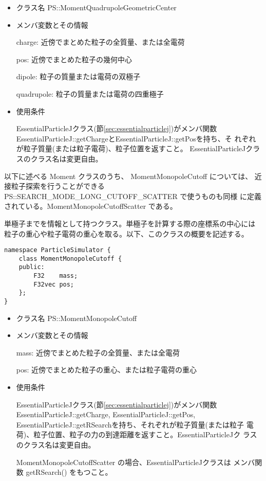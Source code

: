\begin{itemize}
\item クラス名
  PS::MomentQuadrupoleGeometricCenter

\item メンバ変数とその情報

  charge: 近傍でまとめた粒子の全質量、または全電荷

  pos: 近傍でまとめた粒子の幾何中心

  dipole: 粒子の質量または電荷の双極子

  quadrupole: 粒子の質量または電荷の四重極子

\item 使用条件

  EssentialParticleJクラス(節\ref{sec:essentialparticlej})がメンバ関数
  EssentialParticleJ::getChargeとEssentialParticleJ::getPosを持ち、そ
  れぞれが粒子質量(または粒子電荷)、粒子位置を返すこと。
  EssentialParticleJクラスのクラス名は変更自由。

\end{itemize}



以下に述べる Moment クラスのうち、
MomentMonopoleCutoff については、
近接粒子探索を行うことができる PS::SEARCH\_MODE\_LONG\_CUTOFF\_SCATTER で使うものも同様
に定義されている。MomentMonopoleCutoffScatter である。



単極子までを情報として持つクラス。単極子を計算する際の座標系の中心には
粒子の重心や粒子電荷の重心を取る。以下、このクラスの概要を記述する。
\begin{screen}
\begin{verbatim}
namespace ParticleSimulator {
    class MomentMonopoleCutoff {
    public:
        F32    mass;
        F32vec pos;
    };
}
\end{verbatim}
\end{screen}

\begin{itemize}
\item クラス名
  PS::MomentMonopoleCutoff

\item メンバ変数とその情報

  mass: 近傍でまとめた粒子の全質量、または全電荷

  pos: 近傍でまとめた粒子の重心、または粒子電荷の重心

\item 使用条件

  EssentialParticleJクラス(節\ref{sec:essentialparticlej})がメンバ関数
  EssentialParticleJ::getCharge, EssentialParticleJ::getPos,
  EssentialParticleJ::getRSearchを持ち、それぞれが粒子質量(または粒子
  電荷)、粒子位置、粒子の力の到達距離を返すこと。EssentialParticleJク
  ラスのクラス名は変更自由。

   MomentMonopoleCutoffScatter の場合、EssentialParticleJクラスは
  メンバ関数 getRSearch() をもつこと。


\end{itemize}

